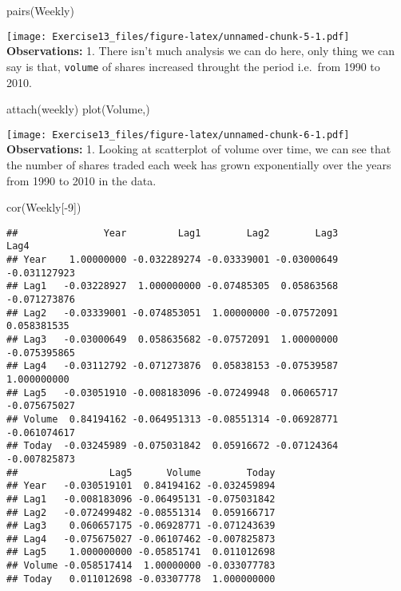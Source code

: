 \documentclass[
]{article}
\newenvironment{Shaded}{\begin{snugshade}}{\end{snugshade}}
\newcommand{\DecValTok}[1]{\textcolor[rgb]{0.00,0.00,0.81}{#1}}
\newcommand{\FunctionTok}[1]{\textcolor[rgb]{0.00,0.00,0.00}{#1}}
\newcommand{\NormalTok}[1]{#1}
\newcommand{\SpecialCharTok}[1]{\textcolor[rgb]{0.00,0.00,0.00}{#1}}
\begin{document}
\begin{Shaded}
\begin{Highlighting}[]
\FunctionTok{pairs}\NormalTok{(Weekly)}
\end{Highlighting}
\end{Shaded}

\texttt{[image: Exercise13\_files/figure-latex/unnamed-chunk-5-1.pdf]}
\textbf{Observations:} 1. There isn't much analysis we can do here, only
thing we can say is that, \texttt{volume} of shares increased throught
the period i.e.~from 1990 to 2010.

\begin{Shaded}
\begin{Highlighting}[]
\FunctionTok{attach}\NormalTok{(weekly)}
\FunctionTok{plot}\NormalTok{(Volume,)}
\end{Highlighting}
\end{Shaded}

\texttt{[image: Exercise13\_files/figure-latex/unnamed-chunk-6-1.pdf]}
\textbf{Observations:} 1. Looking at scatterplot of volume over time, we
can see that the number of shares traded each week has grown
exponentially over the years from 1990 to 2010 in the data.

\begin{Shaded}
\begin{Highlighting}[]
\FunctionTok{cor}\NormalTok{(Weekly[}\SpecialCharTok{{-}}\DecValTok{9}\NormalTok{])}
\end{Highlighting}
\end{Shaded}

\begin{verbatim}
##               Year         Lag1        Lag2        Lag3         Lag4
## Year    1.00000000 -0.032289274 -0.03339001 -0.03000649 -0.031127923
## Lag1   -0.03228927  1.000000000 -0.07485305  0.05863568 -0.071273876
## Lag2   -0.03339001 -0.074853051  1.00000000 -0.07572091  0.058381535
## Lag3   -0.03000649  0.058635682 -0.07572091  1.00000000 -0.075395865
## Lag4   -0.03112792 -0.071273876  0.05838153 -0.07539587  1.000000000
## Lag5   -0.03051910 -0.008183096 -0.07249948  0.06065717 -0.075675027
## Volume  0.84194162 -0.064951313 -0.08551314 -0.06928771 -0.061074617
## Today  -0.03245989 -0.075031842  0.05916672 -0.07124364 -0.007825873
##                Lag5      Volume        Today
## Year   -0.030519101  0.84194162 -0.032459894
## Lag1   -0.008183096 -0.06495131 -0.075031842
## Lag2   -0.072499482 -0.08551314  0.059166717
## Lag3    0.060657175 -0.06928771 -0.071243639
## Lag4   -0.075675027 -0.06107462 -0.007825873
## Lag5    1.000000000 -0.05851741  0.011012698
## Volume -0.058517414  1.00000000 -0.033077783
## Today   0.011012698 -0.03307778  1.000000000
\end{verbatim}
\end{document}
